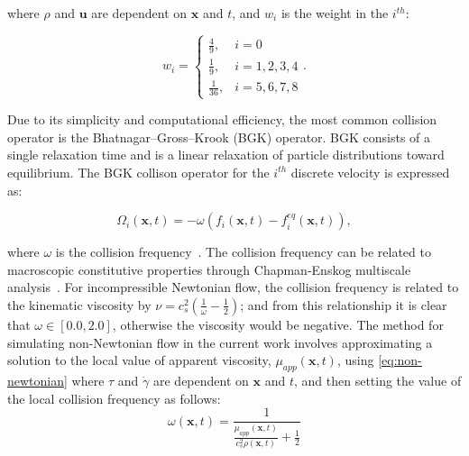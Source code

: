 \documentclass[pdftex,ms]{pittetd}
\newcommand{\pos}{\mathbf{x}}
\newcommand{\mvel}{\mathbf{u}}
\begin{document}
\noindent where $\rho$ and $\mvel$ are dependent on $\pos$ and $t$, and $w_i$ is the weight in the $i^{th}$:%

\begin{equation} \label{eq:weights}
w_i = \begin{cases}
    \frac{4}{9}, & i = 0 \\
    \frac{1}{9}, & i = 1, 2, 3, 4 \\
    \frac{1}{36}, & i = 5, 6, 7, 8
\end{cases}.
\end{equation}

Due to its simplicity and computational efficiency, the most common collision operator is the Bhatnagar--Gross--Krook (BGK) operator.
BGK consists of a single relaxation time and is a linear relaxation of particle distributions toward equilibrium.
The BGK collison operator for the $i^{th}$ discrete velocity is expressed as:

\begin{equation} \label{eq:bgk}
\Omega_i(\pos, t) = -\omega (f_i(\pos, t) - f_i^{eq}(\pos, t)),
\end{equation}

\noindent where $\omega$ is the collision frequency~\cite{Bha54}.
The collision frequency can be related to macroscopic constitutive properties through Chapman-Enskog multiscale analysis~\cite{wolf2000lattice}.
For incompressible Newtonian flow, the collision frequency is related to the kinematic viscosity by $\nu = c_s^2(\frac{1}{\omega} - \frac{1}{2})$; and from this relationship it is clear that $\omega \in [0.0, 2.0]$, otherwise the viscosity would be negative.
The method for simulating non-Newtonian flow in the current work involves approximating a solution to the local value of apparent viscosity, $\mu_{app}(\pos, t)$, using \eqref{eq:non-newtonian} where $\tau$ and $\dot{\gamma}$ are dependent on $\pos$ and $t$, and then setting the value of the local collision frequency as follows:
\begin{equation} \label{eq:colfeq-non-newtonian}
\omega(\pos, t) = \frac{1}{\frac{\mu_{app}(\pos, t)}{c_s^2 \rho(\pos, t)} + \frac{1}{2}}
\end{equation}
\end{document}
